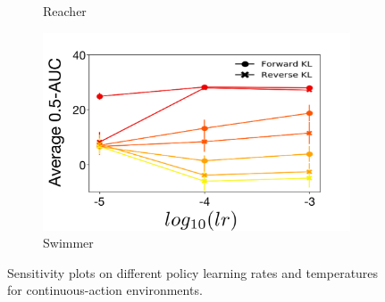 \documentclass{article}
\begin{document}
\begin{figure}[!ht]
\begin{subfigure}[b]{0.3\linewidth}
    \caption{Reacher
    }\label{fig:reacher-pi}
  \end{subfigure}%
  \begin{subfigure}[b]{0.3\linewidth}
    \centering
    \includegraphics[width=\columnwidth]{figs/deep/continuous/Swimmer_pi_ss.pdf} 
    \caption{Swimmer}
    \label{fig:swimmer-pi}
  \end{subfigure}%
  \caption{Sensitivity plots on different policy learning rates and temperatures for continuous-action environments.}
\end{figure}
\end{document}
